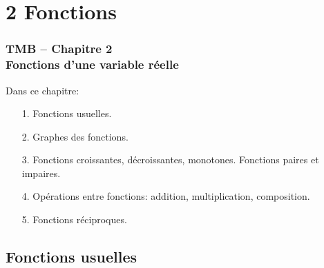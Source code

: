 \documentclass[10pt]{beamer}
\begin{document}
\section{2 Fonctions}

\begin{frame}[plain]
\frametitle{\bf TMB -- Chapitre 2 \\ 
Fonctions d'une variable r\'eelle}

Dans ce chapitre: 
\begin{itemize}
\item[1.] Fonctions usuelles. 

\item[2.] Graphes des fonctions. 

\item[3.] Fonctions croissantes, d\'ecroissantes, monotones. 
Fonctions paires et impaires. 

\item[4.] Op\'erations entre fonctions: addition, multiplication, 
composition. 

\item[5.] Fonctions r\'eciproques. 
\end{itemize}

\end{frame}


\subsection{Fonctions usuelles} 
\end{document}
